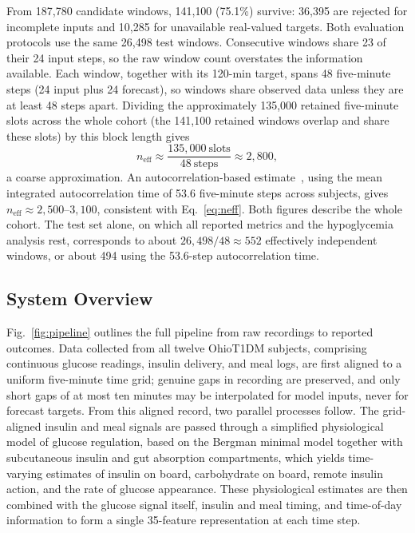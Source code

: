 \documentclass[journal]{IEEEtran}
\begin{document}
From 187,780 candidate windows, 141,100 (75.1\%) survive: 36,395 are rejected for incomplete inputs and 10,285 for unavailable real-valued targets. Both evaluation protocols use the same 26,498 test windows. Consecutive windows share 23 of their 24 input steps, so the raw window count overstates the information available. Each window, together with its 120-min target, spans 48 five-minute steps (24 input plus 24 forecast), so windows share observed data unless they are at least 48 steps apart. Dividing the approximately 135,000 retained five-minute slots across the whole cohort (the 141,100 retained windows overlap and share these slots) by this block length gives
\begin{equation}
n_{\text{eff}} \approx \frac{135{,}000\ \text{slots}}{48\ \text{steps}} \approx 2{,}800,
\label{eq:neff}
\end{equation}
a coarse approximation. An autocorrelation-based estimate~\cite{refBH}, using the mean integrated autocorrelation time of 53.6 five-minute steps across subjects, gives $n_{\text{eff}} \approx 2{,}500$--$3{,}100$, consistent with Eq.~\eqref{eq:neff}. Both figures describe the whole cohort. The test set alone, on which all reported metrics and the hypoglycemia analysis rest, corresponds to about $26{,}498/48 \approx 552$ effectively independent windows, or about 494 using the 53.6-step autocorrelation time.

\subsection{System Overview}

Fig.~\ref{fig:pipeline} outlines the full pipeline from raw recordings to reported outcomes. Data collected from all twelve OhioT1DM subjects, comprising continuous glucose readings, insulin delivery, and meal logs, are first aligned to a uniform five-minute time grid; genuine gaps in recording are preserved, and only short gaps of at most ten minutes may be interpolated for model inputs, never for forecast targets. From this aligned record, two parallel processes follow. The grid-aligned insulin and meal signals are passed through a simplified physiological model of glucose regulation, based on the Bergman minimal model together with subcutaneous insulin and gut absorption compartments, which yields time-varying estimates of insulin on board, carbohydrate on board, remote insulin action, and the rate of glucose appearance. These physiological estimates are then combined with the glucose signal itself, insulin and meal timing, and time-of-day information to form a single 35-feature representation at each time step.
\end{document}
